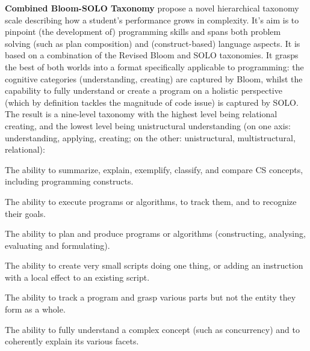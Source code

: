 \newline \noindent \textbf{Combined Bloom-SOLO Taxonomy}\newline
{}
 propose a novel hierarchical taxonomy scale describing how a student’s performance grows in complexity. It’s aim is to pinpoint (the development of) programming skills and spans both problem solving (such as plan composition) and (construct-based) language aspects. It is based on a combination of the Revised Bloom and SOLO taxonomies.  It grasps the best of both worlds into a format specifically applicable to programming: the cognitive categories (understanding, creating) are captured by Bloom, whilst the capability to fully understand or create a program on a holistic perspective (which by definition tackles the magnitude of code issue) is captured by SOLO. The result is a nine-level taxonomy with the highest level being relational creating, and the lowest level being unistructural understanding (on one axis: understanding, applying, creating; on the other: unistructural, multistructural, relational):



\begin{description}[leftmargin=1em]
\item[Understanding:] The ability to summarize, explain, exemplify,
    classify, and compare CS concepts, including programming constructs.
\item[Applying:] The ability to execute programs or algorithms, to track
    them, and to recognize their goals.
\item[Creating:] The ability to plan and produce programs or algorithms
    (constructing, analysing, evaluating and formulating).
\item[Unistructural:] The ability to create very small scripts doing one
    thing, or adding an instruction with a local effect to an existing
    script.
\item[Multistructural:] The ability to track a program and grasp various
    parts but not the entity they form as a whole.
\item[Relational:] The ability to fully understand a complex concept (such
    as concurrency) and to coherently explain its various facets.
\end{description}

